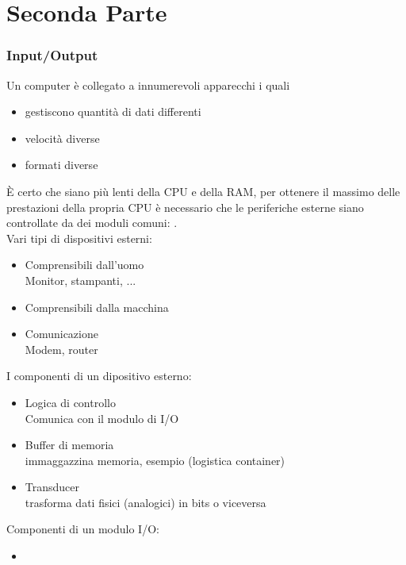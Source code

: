 \documentclass[arch.tex]{subfiles}
\begin{document}
\chapter{Seconda Parte}
\subsection{Input/Output}%
\label{sub:input_output}
Un computer è collegato a innumerevoli apparecchi i quali

\begin{itemize}
	\item gestiscono quantità di dati differenti
	\item velocità diverse
	\item formati diverse
\end{itemize}
È certo che siano più lenti della CPU e della RAM, per ottenere il massimo delle
prestazioni della propria CPU è necessario che le periferiche esterne siano 
controllate da dei moduli comuni: .\\

Vari tipi di dispositivi esterni:
\begin{itemize}
	\item Comprensibili dall'uomo\\
		Monitor, stampanti, ...
	\item Comprensibili dalla macchina
	\item Comunicazione\\
		Modem, router
\end{itemize}

I componenti di un dipositivo esterno:

\begin{itemize}
	\item Logica di controllo\\
		Comunica con il modulo di I/O
	\item Buffer di memoria\\
		immaggazzina memoria, esempio (logistica container)
	\item Transducer\\
		trasforma dati fisici (analogici) in bits o viceversa
\end{itemize}

Componenti di un modulo I/O:

\begin{itemize}
	\item 					
\end{itemize}
\end{document}
